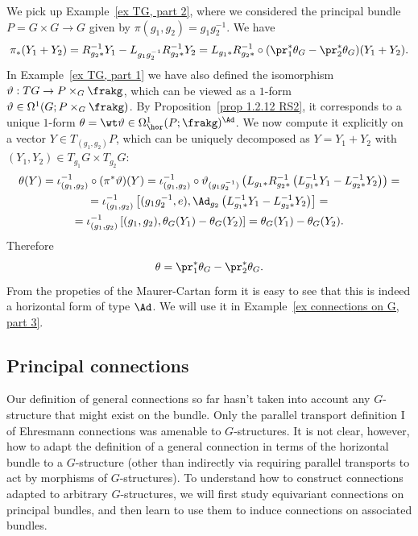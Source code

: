 \begin{example}\label{ex TG, part 3}
    We pick up Example~\ref{ex TG, part 2}, where we considered the principal bundle $P=G\times G\to G$ given by $\pi(g_1,g_2)=g_1g_2^{-1}$. We have 
    \[\pi_\ast(Y_1+Y_2)=R_{g_2\ast}^{-1}Y_1-L_{g_1g_2^{-1}}R_{g_2\ast}^{-1}Y_2=L_{g_1\ast}R_{g_2\ast}^{-1}\circ(\pr_1^\ast\theta_G-\pr_2^\ast\theta_G)(Y_1+Y_2).\]
    In Example~\ref{ex TG, part 1} we have also defined the isomorphism $\vartheta:TG\to P\times_G \frakg$, which can be viewed as a $1$-form $\vartheta\in\Omega^1(G;P\times_G \frakg)$. By Proposition~\ref{prop 1.2.12 RS2}, it corresponds to a unique $1$-form $\theta=\wt\vartheta\in\Omega^1_{\hor}(P;\frakg)^{\Ad}$. We now compute it explicitly on a vector $Y\in T_{(g_1,g_2)}P$, which can be uniquely decomposed as $Y=Y_1+Y_2$ with $(Y_1,Y_2)\in T_{g_1}G\times T_{g_2}G$:
    \begin{multline}
        \theta(Y)=\iota_{(g_1,g_2)}^{-1}\circ (\pi^\ast\vartheta)(Y)=\iota_{(g_1,g_2)}^{-1}\circ\vartheta_{(g_1g_2^{-1})}\left(L_{g_1\ast}R_{g_2\ast}^{-1}\left(L_{g_1\ast}^{-1}Y_1-L_{g_2\ast}^{-1}Y_2\right)\right)=\\
        =\iota_{(g_1,g_2)}^{-1}\left[(g_1g_2^{-1},e),\Ad_{g_2}\left(L_{g_1\ast}^{-1}Y_1-L_{g_2\ast}^{-1}Y_2\right)\right]=\\
        =\iota_{(g_1,g_2)}^{-1}\left[(g_1,g_2),\theta_G(Y_1)-\theta_G(Y_2)\right]=\theta_G(Y_1)-\theta_G(Y_2).
    \end{multline}
    Therefore 
    \[\theta=\pr_1^\ast \theta_G-\pr_2^\ast\theta_G.\]
    From the propeties of the Maurer-Cartan form it is easy to see that this is indeed a horizontal form of type $\Ad$. We will use it in Example~\ref{ex connections on G, part 3}.
\end{example}








\subsection{Principal connections}\label{sec principal connections}

Our definition of general connections so far hasn't taken into account any $G$-structure that might exist on the bundle. Only the parallel transport definition I of Ehresmann connections was amenable to $G$-structures. It is not clear, however, how to adapt the definition of a general connection in terms of the horizontal bundle to a $G$-structure (other than indirectly via requiring parallel transports to act by morphisms of $G$-structures). To understand how to construct connections adapted to arbitrary $G$-structures, we will first study equivariant connections on principal bundles, and then learn to use them to induce connections on associated bundles.

